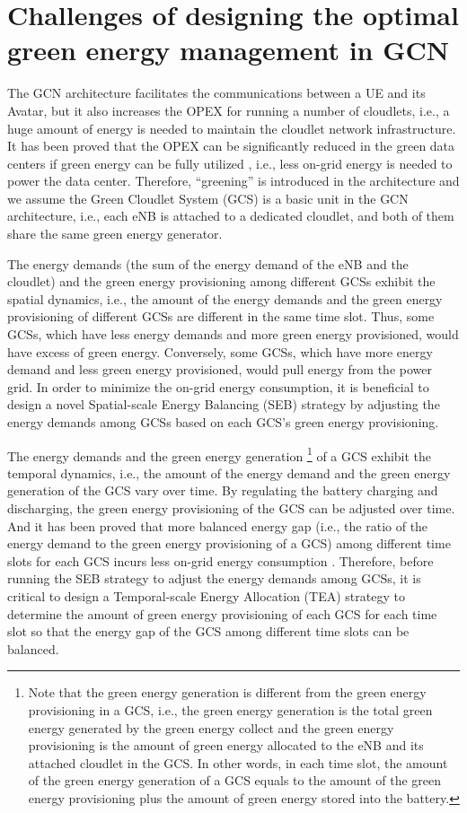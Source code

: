 \documentclass[journal,12pt,draftclsnofoot,onecolumn]{IEEEtran}
\begin{document}
\section{Challenges of designing the optimal green energy management in GCN}
The GCN architecture facilitates the communications between a UE and its Avatar, but it also increases the OPEX for running a number of cloudlets, i.e., a huge amount of energy is needed to maintain the cloudlet network infrastructure. It has been proved that the OPEX can be significantly reduced in the green data centers if green energy can be fully utilized \cite{10}, i.e., less on-grid energy is needed to power the data center. Therefore, “greening” is introduced in the architecture and we assume the Green Cloudlet System (GCS) is a basic unit in the GCN architecture, i.e., each eNB is attached to a dedicated cloudlet, and both of them share the same green energy generator. 

The energy demands (the sum of the energy demand of the eNB and the cloudlet) and the green energy provisioning among different GCSs exhibit the spatial dynamics, i.e., the amount of the energy demands and the green energy provisioning of different GCSs are different in the same time slot. Thus, some GCSs, which have less energy demands and more green energy provisioned, would have excess of green energy. Conversely, some GCSs, which have more energy demand and less green energy provisioned, would pull energy from the power grid. In order to minimize the on-grid energy consumption, it is beneficial to design a novel Spatial-scale Energy Balancing (SEB) strategy by adjusting the energy demands among GCSs based on each GCS's green energy provisioning.

The energy demands and the green energy generation \footnote{Note that the green energy generation is different from the green energy provisioning in a GCS, i.e., the green energy generation is the total green energy generated by the green energy collect and the green energy provisioning is the amount of green energy allocated to the eNB and its attached cloudlet in the GCS. In other words, in each time slot, the amount of the green energy generation of a GCS equals to the amount of the green energy provisioning plus the amount of green energy stored into the battery.} of a GCS exhibit the temporal dynamics, i.e., the amount of the energy demand and the green energy generation of the GCS vary over time. By regulating the battery charging and discharging, the green energy provisioning of the GCS can be adjusted over time. And it has been proved that more balanced energy gap (i.e., the ratio of the energy demand to the green energy provisioning of a GCS) among different time slots for each GCS incurs less on-grid energy consumption \cite{11}. Therefore, before running the SEB strategy to adjust the energy demands among GCSs, it is critical to design a Temporal-scale Energy Allocation (TEA) strategy to determine the amount of green energy provisioning of each GCS for each time slot so that the energy gap of the GCS among different time slots can be balanced. 
\end{document}
